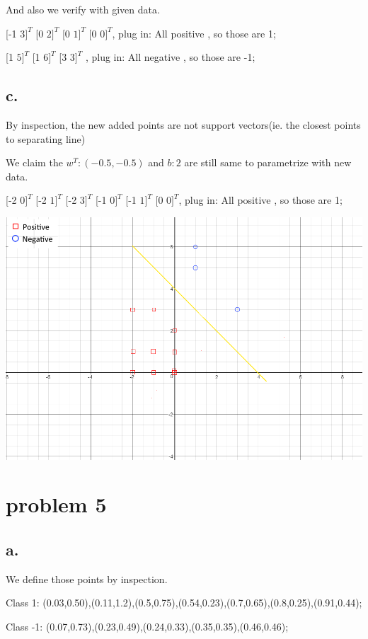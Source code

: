 \documentclass[12pt, letterpaper]{article}
\begin{document}
And also we verify with given data.

[-1 $3]^{T}$ [0 $2]^{T}$ [0 $1]^{T}$ [0 $0]^{T}$, plug in:
All positive , so those are 1;

[1 $5]^{T}$ [1 $6]^{T}$ [3 $3]^{T}$ , plug in:
All negative , so those are -1;



\subsection{c.}
By inspection, the new added points are not support vectors(ie. the closest points to separating line)

We claim the $w^{T}:(-0.5,-0.5)$ and $b:2$ are still same to parametrize with new data. 

[-2 $0]^{T}$ [-2 $1]^{T}$ [-2 $3]^{T}$ [-1 $0]^{T}$ [-1 $1]^{T}$ [0 $0]^{T}$, plug in:
All positive , so those are 1;

\includegraphics[scale=0.6]{"problem-3-c"}

\section{problem 5}
\subsection{a.}

We define those points by inspection.

Class 1: (0.03,0.50),(0.11,1.2),(0.5,0.75),(0.54,0.23),(0.7,0.65),(0.8,0.25),(0.91,0.44);

Class -1: (0.07,0.73),(0.23,0.49),(0.24,0.33),(0.35,0.35),(0.46,0.46);
\end{document}

